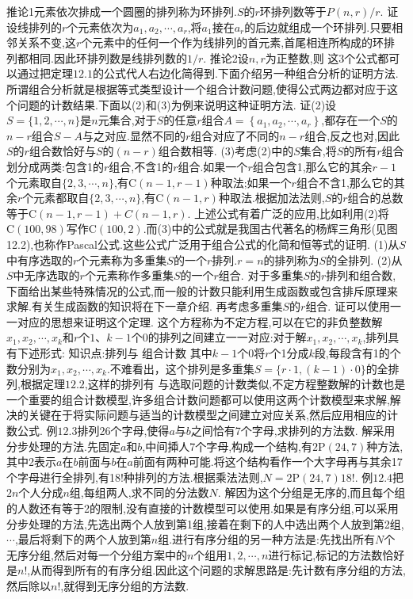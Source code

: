 推论1元素依次排成一个圆圈的排列称为环排列.$S$的$r$环排列数等于$P(n,r)/r$.
证设线排列的$r$个元素依次为$a_{1},a_{2},\cdots,a_{r}$,将$a_{1}$接在$a_{r}$的后边就组成一个环排列.只要相邻关系不变,这$r$个元素中的任何一个作为线排列的首元素,首尾相连所构成的环排列都相同.因此环排列数是线排列数的$1/r$.
推论2设$n,r$为正整数,则
这3个公式都可以通过把定理$12.1$的公式代人右边化简得到.下面介绍另一种组合分析的证明方法.所谓组合分析就是根据等式类型设计一个组合计数问题,使得公式两边都对应于这个问题的计数结果.下面以(2)和(3)为例来说明这种证明方法.
证(2)设$S=\{1,2,\cdots,n\}$是$n$元集合,对于$S$的任意$r$组合$A=\left\{a_{1},a_{2},\cdots,a_{r}\right\}$,都存在一个$S$的$n-r$组合$S-A$与之对应.显然不同的$r$组合对应了不同的$n-r$组合,反之也对,因此$S$的$r$组合数恰好与$S$的$(n-r)$组合数相等.
(3)考虑(2)中的$S$集合,将$S$的所有$r$组合划分成两类:包含1的$r$组合,不含1的$r$组合.如果一个$r$组合包含1,那么它的其余$r-1$个元素取自$\{2,3,\cdots,n\}$,有$\mathrm{C}(n-1,r-1)$种取法;如果一个$r$组合不含1,那么它的其余$r$个元素都取自$\{2,3,\cdots,n\}$,有$\mathrm{C}(n-1,r)$种取法.根据加法法则,$S$的$r$组合的总数等于$\mathrm{C}(n-1,r-1)+C(n-1,r)$.
上述公式有着广泛的应用,比如利用(2)将$\mathrm{C}(100,98)$写作$\mathrm{C}(100,2)$.而(3)中的公式就是我国古代著名的杨辉三角形(见图12.2),也称作Pascal公式.这些公式广泛用于组合公式的化简和恒等式的证明.
(1)从$S$中有序选取的$r$个元素称为多重集$S$的一个$r$排列.$r=n$的排列称为$S$的全排列.
(2)从$S$中无序选取的$r$个元素称作多重集$S$的一个$r$组合.
对于多重集$S$的$r$排列和组合数,下面给出某些特殊情况的公式,而一般的计数只能利用生成函数或包含排斥原理来求解.有关生成函数的知识将在下一章介绍.
再考虑多重集$S$的$r$组合.
证可以使用一一对应的思想来证明这个定理.
这个方程称为不定方程,可以在它的非负整数解$x_{1},x_{2},\cdots,x_{k}$和$r$个$1、k-1$个0的排列之间建立一一对应:对于解$x_{1},x_{2},\cdots,x_{k}$,排列具有下述形式:
知识点:排列与
组合计数
其中$k-1$个0将$r$个1分成$k$段,每段含有1的个数分别为$x_{1},x_{2},\cdots,x_{k}$.不难看出，这个排列是多重集$S=\{r\cdot1,(k-1)\cdot0\}$的全排列,根据定理$12.2$,这样的排列有
与选取问题的计数类似,不定方程整数解的计数也是一个重要的组合计数模型,许多组合计数问题都可以使用这两个计数模型来求解,解决的关键在于将实际问题与适当的计数模型之间建立对应关系,然后应用相应的计数公式.
例$12.3$排列26个字母,使得$a$与$b$之间恰有7个字母,求排列的方法数.
解采用分步处理的方法.先固定$a$和$b$,中间揷人7个字母,构成一个结构,有$2\mathrm{P}(24,7)$种方法,其中2表示$a$在$b$前面与$b$在$a$前面有两种可能.将这个结构看作一个大字母再与其余17个字母进行全排列,有18!种排列的方法.根据乘法法则,$N=2\mathrm{P}(24,7)18!$.
例$12.4$把$2n$个人分成$n$组,每组两人,求不同的分法数$N$.
解因为这个分组是无序的,而且每个组的人数还有等于2的限制,没有直接的计数模型可以使用.如果是有序分组,可以采用分步处理的方法,先选出两个人放到第1组,接着在剩下的人中选出两个人放到第2组,$\cdots$,最后将剩下的两个人放到第$n$组.进行有序分组的另一种方法是:先找出所有$N$个无序分组,然后对每一个分组方案中的$n$个组用$1,2,\cdots,n$进行标记,标记的方法数恰好是$n$!,从而得到所有的有序分组.因此这个问题的求解思路是:先计数有序分组的方法,然后除以$n$!,就得到无序分组的方法数.
